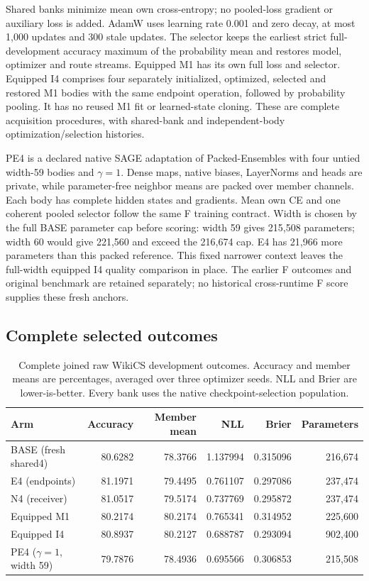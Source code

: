 Shared banks minimize mean own cross-entropy; no pooled-loss gradient or auxiliary loss is added. AdamW uses learning rate 0.001 and zero decay, at most 1,000 updates and 300 stale updates. The selector keeps the earliest strict full-development accuracy maximum of the probability mean and restores model, optimizer and route streams. Equipped M1 has its own full loss and selector. Equipped I4 comprises four separately initialized, optimized, selected and restored M1 bodies with the same endpoint operation, followed by probability pooling. It has no reused M1 fit or learned-state cloning. These are complete acquisition procedures, with shared-bank and independent-body optimization/selection histories.

PE4 is a declared native SAGE adaptation of Packed-Ensembles with four untied width-59 bodies and $\gamma=1$. Dense maps, native biases, LayerNorms and heads are private, while parameter-free neighbor means are packed over member channels. Each body has complete hidden states and gradients. Mean own CE and one coherent pooled selector follow the same F training contract. Width is chosen by the full BASE parameter cap before scoring: width 59 gives 215,508 parameters; width 60 would give 221,560 and exceed the 216,674 cap. E4 has 21,966 more parameters than this packed reference. This fixed narrower context leaves the full-width equipped I4 quality comparison in place. The earlier F outcomes and original benchmark are retained separately; no historical cross-runtime F score supplies these fresh anchors.

\subsection{Complete selected outcomes}

\begin{table}[t]
\centering\small\setlength{\tabcolsep}{4pt}
\caption{Complete joined raw WikiCS development outcomes. Accuracy and member means are percentages, averaged over three optimizer seeds. NLL and Brier are lower-is-better. Every bank uses the native checkpoint-selection population.}
\label{tab:E-PE-raw}
\begin{tabular}{lrrrrr}
\toprule
Arm & Accuracy & Member mean & NLL & Brier & Parameters\\
\midrule
BASE (fresh shared4) & 80.6282 & 78.3766 & 1.137994 & 0.315096 & 216,674\\
E4 (endpoints) & 81.1971 & 79.4495 & 0.761107 & 0.297086 & 237,474\\
N4 (receiver) & 81.0517 & 79.5174 & 0.737769 & 0.295872 & 237,474\\
Equipped M1 & 80.2174 & 80.2174 & 0.765341 & 0.314952 & 225,600\\
Equipped I4 & 80.8937 & 80.2127 & 0.688787 & 0.293094 & 902,400\\
PE4 ($\gamma=1$, width 59) & 79.7876 & 78.4936 & 0.695566 & 0.306853 & 215,508\\
\bottomrule\end{tabular}\end{table}

